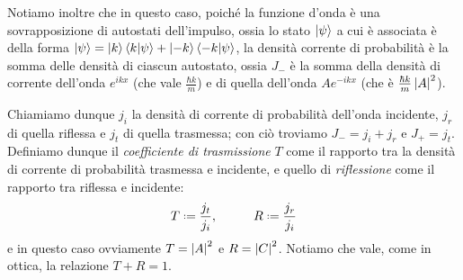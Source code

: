 Notiamo inoltre che in questo caso, poich\'e la funzione d'onda è una sovrapposizione di autostati dell'impulso, ossia lo stato $\left|{\psi}\right\rangle$ a cui è associata è della forma $\left|{\psi}\right\rangle=\left|{k}\right\rangle\left\langle{k}\middle|{\psi}\right\rangle+\left|{-k}\right\rangle\left\langle{-k}\middle|{\psi}\right\rangle$, la densità corrente di probabilità è la somma delle densità di ciascun autostato, ossia $J_-$ è la somma della densità di corrente dell'onda $e^{ikx}$ (che vale $\frac{\hbar k}{m}$) e di quella dell'onda $Ae^{-ikx}$ (che è $\frac{\hbar k}{m}\left|{A}\right|^2$).

Chiamiamo dunque $j_i$ la densità di corrente di probabilità dell'onda incidente, $j_r$ di quella riflessa e $j_t$ di quella trasmessa; con ciò troviamo $J_-=j_i+j_r$ e $J_+=j_t$.
Definiamo dunque il \emph{coefficiente di trasmissione} $T$ come il rapporto tra la densità di corrente di probabilità trasmessa e incidente, e quello di \emph{riflessione} come il rapporto tra riflessa e incidente:
\begin{equation}
	T\defeq\frac{j_t}{j_i},\hspace{1cm} R\defeq\frac{j_r}{j_i}
	\label{eq:coefficienti-trasmissione-riflessione}
\end{equation}
e in questo caso ovviamente $T=\left|{A}\right|^2$ e $R=\left|{C}\right|^2$.
Notiamo che vale, come in ottica, la relazione $T+R=1$.

